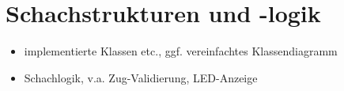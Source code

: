 
\section{Schachstrukturen und -logik}

\begin{itemize}
    \item implementierte Klassen etc., ggf. vereinfachtes Klassendiagramm
    \item Schachlogik, v.a. Zug-Validierung, LED-Anzeige
\end{itemize}
